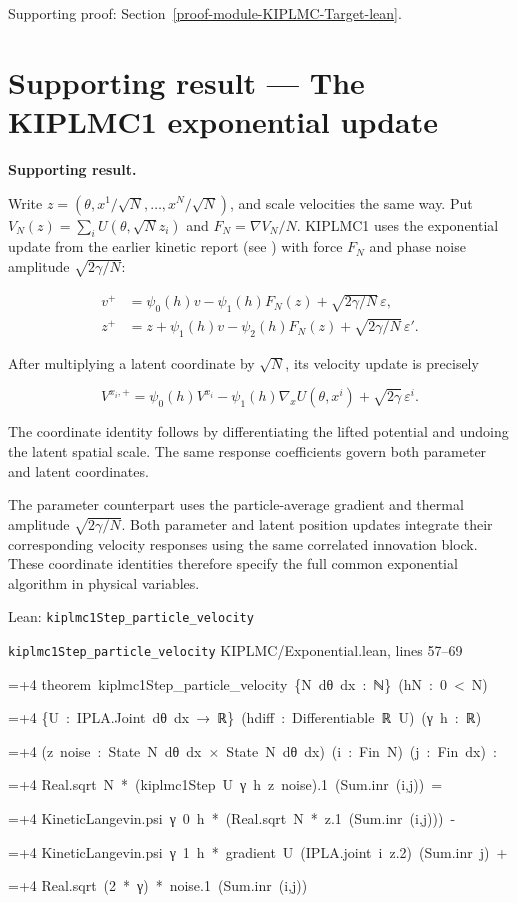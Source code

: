 \documentclass[11pt,a4paper]{report}
\newlength{\leancharwidth}
\newenvironment{leancode}{\par\smallskip\begingroup\ttfamily\footnotesize\raggedright
  \settowidth{\leancharwidth}{M}\setlength{\parskip}{0pt}\setlength{\parindent}{0pt}
  \frenchspacing}{\par\endgroup\smallskip}
\newcommand{\leanline}[2]{\hangindent=\dimexpr#1\leancharwidth+4\leancharwidth\relax
  \hangafter=1\noindent\hspace*{#1\leancharwidth}#2\par}
\newcommand{\leansource}[1]{\par{\footnotesize\color{leanmuted}#1}\par}
\begin{document}
{\small\color{gray}Supporting proof: Section~\ref{proof-module-KIPLMC-Target-lean}.\par}
\section{\texorpdfstring{Supporting result — The KIPLMC1 exponential update}{Supporting result — The KIPLMC1 exponential update}}


\textbf{Supporting result.}



Write \(z=(\theta,x^1/\sqrt N,\ldots,x^N/\sqrt N)\),
and scale velocities the same way. Put
\(V_N(z)=\sum_iU(\theta,\sqrt N z_i)\) and
\(F_N=\nabla V_N/N\). KIPLMC1 uses the exponential update from the earlier kinetic report (see \cite[Section~3.12.2]{LangevinLean2026Kinetic})
with force \(F_N\) and phase noise amplitude \(\sqrt{2\gamma/N}\):


\[\begin{aligned}
v^+&=\psi_0(h)v-\psi_1(h)F_N(z)+\sqrt{2\gamma/N}\,\varepsilon,\\
z^+&=z+\psi_1(h)v-\psi_2(h)F_N(z)+\sqrt{2\gamma/N}\,\varepsilon'.
\end{aligned}\]


After multiplying a latent coordinate by \(\sqrt N\), its velocity update
is precisely


\[V^{x_i,+}=\psi_0(h)V^{x_i}-\psi_1(h)\nabla_xU(\theta,x^i)
+\sqrt{2\gamma}\,\varepsilon^i.\]


The coordinate identity follows by differentiating the lifted potential and undoing the latent spatial scale. The same response coefficients govern both parameter and latent coordinates.



The parameter counterpart uses the particle-average gradient and thermal amplitude \(\sqrt{2\gamma/N}\). Both parameter and latent position updates integrate their corresponding velocity responses using the same correlated innovation block. These coordinate identities therefore specify the full common exponential algorithm in physical variables.

\begin{leanbox}{Lean: \texttt{kiplmc1Step\_\allowbreak{}particle\_\allowbreak{}velocity}}
\leansource{\texttt{kiplmc1Step\_\allowbreak{}particle\_\allowbreak{}velocity} \quad KIPLMC/\allowbreak{}Exponential.lean, lines 57–69}
\begin{leancode}
\leanline{0}{theorem\ kiplmc1Step\_particle\_velocity\ \{N\ dθ\ dx\ :\ ℕ\}\ (hN\ :\ 0\ <\ N)}
\leanline{4}{\{U\ :\ IPLA.Joint\ dθ\ dx\ →\ ℝ\}\ (hdiff\ :\ Differentiable\ ℝ\ U)\ (γ\ h\ :\ ℝ)}
\leanline{4}{(z\ noise\ :\ State\ N\ dθ\ dx\ ×\ State\ N\ dθ\ dx)\ (i\ :\ Fin\ N)\ (j\ :\ Fin\ dx)\ :}
\leanline{4}{Real.sqrt\ N\ *\ (kiplmc1Step\ U\ γ\ h\ z\ noise).1\ (Sum.inr\ (i,j))\ =}
\leanline{6}{KineticLangevin.psi\ γ\ 0\ h\ *\ (Real.sqrt\ N\ *\ z.1\ (Sum.inr\ (i,j)))\ -}
\leanline{6}{KineticLangevin.psi\ γ\ 1\ h\ *\ gradient\ U\ (IPLA.joint\ i\ z.2)\ (Sum.inr\ j)\ +}
\leanline{6}{Real.sqrt\ (2\ *\ γ)\ *\ noise.1\ (Sum.inr\ (i,j))}
\end{leancode}
\end{leanbox}
\end{document}
